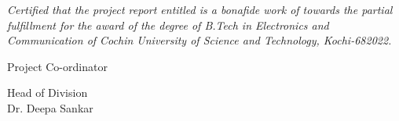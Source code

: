 \vspace*{\fill}
\begin{center}
	\thispagestyle{empty}
	\vspace{1cm}
	\par
	\vspace{1cm}

	\vspace{.3cm}
	\textit{
		Certified that the project report entitled 
		is a bonafide work of  towards the partial
		fulfillment for the award of the
		degree of B.Tech in Electronics and Communication of Cochin
		University of Science and Technology, Kochi-682022.
	}

	\vspace{3cm}
	\begin{minipage}[t][][r]{.4\linewidth}
		Project Co-ordinator
	\end{minipage}
	\hfill
	\begin{minipage}[t][][l]{.4\linewidth}
		\begin{flushright}
			Head of Division\\
			Dr. Deepa Sankar
		\end{flushright}
	\end{minipage}
\end{center}
\vspace*{\fill}
